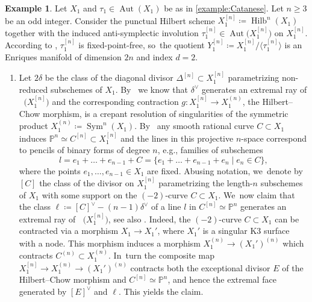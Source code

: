 \documentclass[JEP,XML,SOM,Unicode,published]{cedram}
\newenvironment{enumeratea}
{\bgroup\def\theenumi{\alph{enumi}}\begin{enumerate}}
{\end{enumerate}\egroup}
\renewcommand\theenumi{\roman{enumi}}
\theoremstyle{plain}
\theoremstyle{definition}
\newtheorem{exa}[thm]{Example}
\renewcommand{\P}{\mathbb{P}}
\DeclareMathOperator{\Aut}{Aut}
\DeclareMathOperator{\Hilb}{Hilb}
\DeclareMathOperator{\Sym}{Sym}
\DeclareMathOperator{\NEb}{\overline{\mathrm{NE}}}
\begin{document}
\begin{exa}
\label{example:PEV_from_Catanese}
Let $X_1$ and $\tau_1 \in \Aut(X_1)$ be as in \autoref{example:Catanese}. Let $n \geq 3$ be an odd integer. Consider the punctual Hilbert scheme $X_1^{[n]} \coloneqq \Hilb^n(X_1)$ together with the induced anti-symplectic involution $ \tau_1^{[n]} \in \Aut \bigl(X_1^{[n]} \bigr)$ on $X_1^{[n]}$. According to \cite[Prop.\,4.1]{OS11a}, $\tau_1^{[n]}$ is fixed-point-free, so~the quotient $Y_1^{[n]} \coloneqq X_1^{[n]} / \langle \tau_1^{[n]} \rangle$ is an Enriques manifold of dimension $2n$ and index $d=2$.

\begin{enumeratea}
\item\label{example:PEV_from_Catanesea}
Let $2\delta$ be the class of the diagonal divisor $\Delta^{[n]}\subset X_1^{[n]}$ parametrizing non-reduced subschemes of $X_1$. By~\cite[Ex.\,4.2]{HT10b} we know that $\delta^\vee$ generates an extremal ray of $\NEb \bigl(X_1^{[n]} \bigr)$ and the corresponding contraction $g \colon X_1^{[n]} \to X_1^{(n)}$, the Hilbert--Chow morphism, is a crepant resolution of singularities of the symmetric product $X_1^{(n)} \coloneqq \Sym^n(X_1)$. By~\cite[Ex.\,4.11]{HT10b} any smooth rational curve $C \subset X_1$ induces $\mathbb{P}^n \simeq C^{[n]} \subset X_1^{[n]}$ and the lines in this projective $n$-space correspond to pencils of binary forms of degree $n$, e.g., families of subschemes
\[
l = e_1 + \ldots + e_{n-1} + C =
\{e_1 + \ldots + e_{n-1} + e_n \mid e_n \in C \},
\]
where the points $e_1, \dots, e_{n-1} \in X_1$ are fixed. Abusing notation, we~denote by $[C]$ the class of the divisor on $X_1^{[n]}$ parametrizing the length-$n$ subschemes of $X_1$ with some support on the $(-2)$-curve $C \subset X_1$. We~now claim that the class $\ell \coloneqq [C]^{\vee} - (n-1)\delta^\vee$ of a line $l$ in $C^{[n]}\simeq \P^n$ generates an extremal ray of $\NEb \bigl(X_1^{[n]} \bigr)$, see also \cite[Ex.\,4.7]{HT10b}. Indeed, the $(-2)$-curve $C \subset X_1$ can be contracted via a morphism $X_1 \to X_1'$, where $X_1'$ is a singular K3 surface with a node. This morphism induces a morphism $X_1^{(n)} \to (X_1')^{(n)}$ which contracts $C^{(n)} \subset X_1^{(n)}$. In~turn the composite map $X_1^{[n]} \to X_1^{(n)} \to (X_1')^{(n)}$ contracts both the exceptional divisor $E$ of the Hilbert--Chow morphism and $C^{[n]} \simeq \P^n$, and hence the extremal face generated by $[E]^{\vee}$ and $\ell$. This yields the claim.


\end{enumeratea}
\end{exa}
\end{document}
